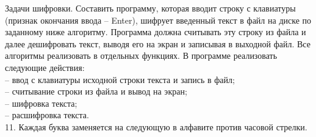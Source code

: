 Задачи шифровки. Составить программу, которая вводит строку с
клавиатуры (признак окончания ввода – Enter), шифрует введенный текст в
файл на диске по заданному ниже алгоритму. Программа должна считывать эту
строку из файла и далее дешифровать текст, выводя его на экран и записывая в
выходной файл. Все алгоритмы реализовать в отдельных функциях.
В программе реализовать следующие действия:\\
 – ввод с клавиатуры исходной строки текста и запись в файл;\\
 – считывание строки из файла и вывод на экран;\\
 – шифровка текста;\\
 – расшифровка текста.\\

11. Каждая буква заменяется на следующую в алфавите против часовой стрелки.
